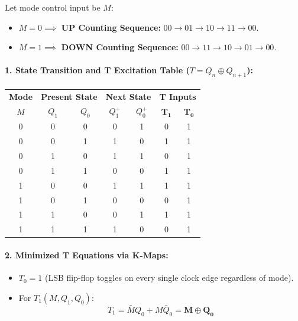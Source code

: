 \documentclass[11pt,a4paper,oneside]{book}
\begin{document}
Let mode control input be $M$:
\begin{itemize}
  \item $M = 0 \implies$ \textbf{UP Counting Sequence:} $00 \to 01 \to 10 \to 11 \to 00$.
  \item $M = 1 \implies$ \textbf{DOWN Counting Sequence:} $00 \to 11 \to 10 \to 01 \to 00$.
\end{itemize}

\paragraph{1. State Transition and T Excitation Table ($T = Q_n \oplus Q_{n+1}$):}
\begin{center}
\begin{tabular}{|c|cc|cc|cc|}
\hline
\textbf{Mode} & \multicolumn{2}{c|}{\textbf{Present State}} & \multicolumn{2}{c|}{\textbf{Next State}} & \multicolumn{2}{c|}{\textbf{T Inputs}} \\
$M$ & $Q_1$ & $Q_0$ & $Q_1^+$ & $Q_0^+$ & $\mathbf{T_1}$ & $\mathbf{T_0}$ \\ \hline
0 & 0 & 0 & 0 & 1 & 0 & 1 \\ \hline
0 & 0 & 1 & 1 & 0 & 1 & 1 \\ \hline
0 & 1 & 0 & 1 & 1 & 0 & 1 \\ \hline
0 & 1 & 1 & 0 & 0 & 1 & 1 \\ \hline
1 & 0 & 0 & 1 & 1 & 1 & 1 \\ \hline
1 & 0 & 1 & 0 & 0 & 0 & 1 \\ \hline
1 & 1 & 0 & 0 & 1 & 1 & 1 \\ \hline
1 & 1 & 1 & 1 & 0 & 0 & 1 \\ \hline
\end{tabular}
\end{center}

\paragraph{2. Minimized T Equations via K-Maps:}
\begin{itemize}
  \item $T_0 = 1$ (LSB flip-flop toggles on every single clock edge regardless of mode).
  \item For $T_1(M, Q_1, Q_0)$:
  \[
  T_1 = \bar{M}Q_0 + M\bar{Q}_0 = \mathbf{M \oplus Q_0}
  \]
\end{itemize}
\end{document}
